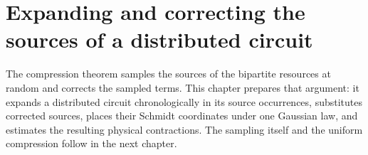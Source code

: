 \chapter{Expanding and correcting the sources of a distributed circuit}
\label{ch:party_circuit_sampling_sources}

The compression theorem \cite[Theorem~5.2]{OpenAI2026PolynomialPEPS} samples
the sources of the bipartite resources at random and corrects the sampled
terms. This chapter prepares that argument: it expands a distributed circuit
chronologically in its source occurrences, substitutes corrected sources,
places their Schmidt coordinates under one Gaussian law, and estimates the
resulting physical contractions. The sampling itself and the uniform
compression follow in the next chapter.














